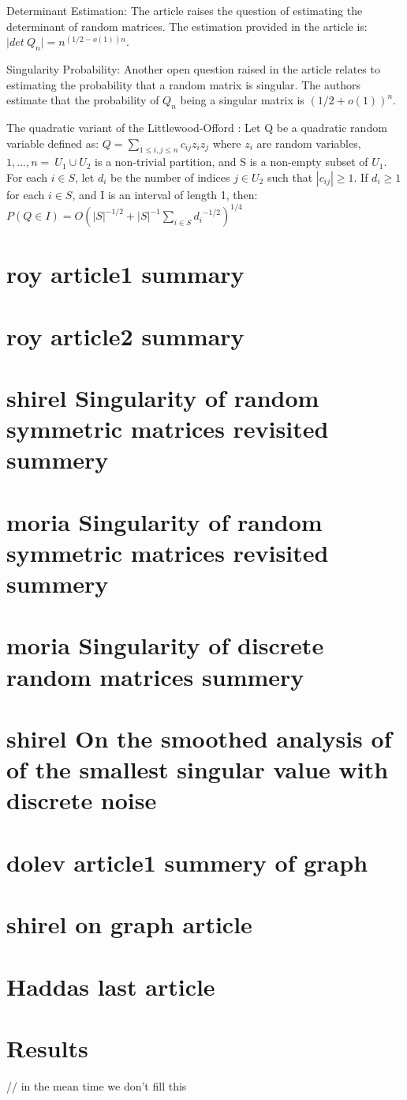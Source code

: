 \documentclass[12pt]{article}
\begin{document}
Determinant Estimation: The article raises the question of estimating the 
determinant of random matrices. The estimation provided in the article is: $ |det\ {Q_n|=}n^{\left(1/2-o\left(1\right)\right)n} $.

Singularity Probability: Another open question raised in the article relates to estimating the 
probability that a random matrix is singular. The authors estimate that
the probability of $ Q_n $ being a singular matrix is $ {(1/2+o\left(1\right))}^n $.

The quadratic variant of the Littlewood-Offord :
Let Q be a quadratic random variable defined as: $ Q=\sum_{1\le i,j\le n}{c_{ij}z_iz_j} $  where $ z_i $
are random variables, $ {1,\ldots,n}=\ U_1\cup U_2  $
is a non-trivial partition, and S is a non-empty subset of
$ U_1 $. For each $ i\in S $, let  $d_i$  be the number of indices  $j\in U_2$ 
such that $|c_{ij}|\geq1$. If 
$ d_i\geq1$ for each $i\in S$, and I is an interval of length 1, then:
$ P\left(Q\in I\right)=O{({|S|}^{-1/2}+{|S|}^{-1}\sum_{i\in S}{d_i}^{-1/2})}^{1/4} $


\section{roy article1 summary}

\section{roy article2 summary}

\section{shirel Singularity of random symmetric matrices revisited summery}

\section{moria Singularity of random symmetric matrices revisited summery}

\section{moria Singularity of discrete random matrices summery}

\section{shirel On the smoothed analysis of of the smallest singular value with discrete noise}

\section{dolev article1 summery of graph}

\section{shirel on graph article}

\section{Haddas last article}

\section{Results}
// in the mean time we don't fill this
\end{document}

